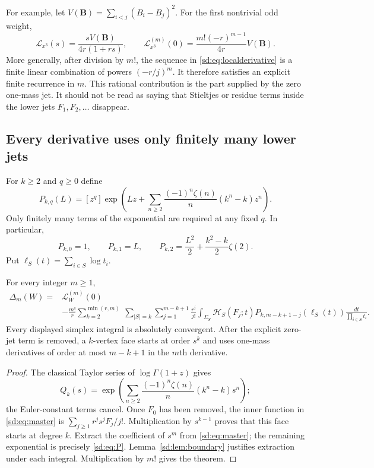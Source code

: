 For example, let $V(\boldsymbol B)=\sum_{i<j}(B_i-B_j)^2$.  For the
first nontrivial odd weight,
\begin{equation}\label{sd:eq:cubiclocal}
 \mathcal L_{x^3}(s)=\frac{sV(\boldsymbol B)}{4r(1+rs)},\qquad
 \mathcal L_{x^3}^{(m)}(0)
       =\frac{m!(-r)^{m-1}}{4r}V(\boldsymbol B).
\end{equation}
More generally, after division by $m!$, the sequence in
\eqref{sd:eq:localderivative} is a finite linear combination of powers
$(-r/j)^m$.  It therefore satisfies an explicit finite recurrence in
$m$.  This rational contribution is the part supplied by the zero
one-mass jet.  It should not be read as saying that Stieltjes or residue
terms inside the lower jets $F_1,F_2,\ldots$ disappear.

\subsection{Every derivative uses only finitely many lower jets}
\label{sd:subsec:allorders}

For $k\ge2$ and $q\ge0$ define
\begin{equation}\label{sd:eq:P}
 P_{k,q}(L)=[z^q]\exp\left(
 Lz+\sum_{n\ge2}\frac{(-1)^n\zeta(n)}n(k^n-k)z^n\right).
\end{equation}
Only finitely many terms of the exponential are required at any fixed
$q$.  In particular,
\[
 P_{k,0}=1,\qquad P_{k,1}=L,\qquad
 P_{k,2}=\frac{L^2}{2}+\frac{k^2-k}{2}\zeta(2).
\]
Put $\ell_S(t)=\sum_{i\in S}\log t_i$.

\begin{theorem}
\label{sd:thm:allorders}
For every integer $m\ge1$,
\begin{equation}\label{sd:eq:allorders}
 \boxed{\begin{aligned}
 \Delta_m(W)={}&\mathcal L_W^{(m)}(0)\\
 &-\frac{m!}{r}
  \sum_{k=2}^{\min(r,m)}\ \sum_{|S|=k}
  \sum_{j=1}^{m-k+1}\frac{r^j}{j!}
   \int_{\Sigma_S}\mathcal H_S(F_j;t)
       P_{k,m-k+1-j}(\ell_S(t))
                     \frac{dt}{\prod_{i\in S}t_i}.
 \end{aligned}}
\end{equation}
Every displayed simplex integral is absolutely convergent.  After the
explicit zero-jet term is removed, a $k$-vertex face starts at order
$s^k$ and uses one-mass derivatives of order at most $m-k+1$ in the
$m$th derivative.
\end{theorem}
\begin{proof}
The classical Taylor series of $\log\Gamma(1+z)$ gives
\[
 Q_k(s)=\exp\left(
       \sum_{n\ge2}\frac{(-1)^n\zeta(n)}n(k^n-k)s^n\right);
\]
the Euler-constant terms cancel.  Once $F_0$ has been removed, the
inner function in \eqref{sd:eq:master} is
$\sum_{j\ge1}r^js^jF_j/j!$.  Multiplication by $s^{k-1}$ proves
that this face starts at degree $k$.  Extract the coefficient of $s^m$
from \eqref{sd:eq:master}; the remaining exponential is precisely
\eqref{sd:eq:P}.  Lemma~\ref{sd:lem:boundary} justifies extraction under
each integral.  Multiplication by $m!$ gives the theorem.
\end{proof}

